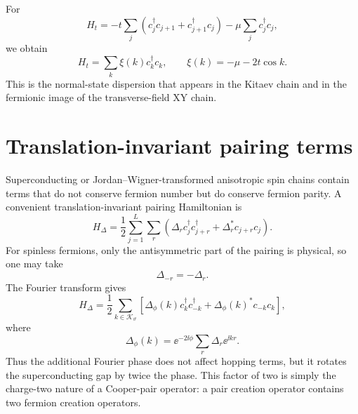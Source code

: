 \begin{example}
For
\begin{equation}
    H_t=-t\sum_j\left(c_j^\dagger c_{j+1}+c_{j+1}^\dagger c_j\right)
    -\mu\sum_j c_j^\dagger c_j,
\end{equation}
we obtain
\begin{equation}
    H_t=
    \sum_k\xi(k)c_k^\dagger c_k,
    \qquad
    \xi(k)=-\mu-2t\cos k.
\end{equation}
This is the normal-state dispersion that appears in the Kitaev chain and in the
fermionic image of the transverse-field XY chain.
\end{example}

\section{Translation-invariant pairing terms}

Superconducting or Jordan--Wigner-transformed anisotropic spin chains contain
terms that do not conserve fermion number but do conserve fermion parity.  A
convenient translation-invariant pairing Hamiltonian is
\begin{equation}
\label{eq:general-pairing-creation-form}
    H_\Delta
    =
    \frac{1}{2}\sum_{j=1}^{L}\sum_r
    \left(
    \Delta_r c_j^\dagger c_{j+r}^\dagger
    +
    \Delta_r^* c_{j+r}c_j
    \right).
\end{equation}
For spinless fermions, only the antisymmetric part of the pairing is physical,
so one may take
\begin{equation}
    \Delta_{-r}=-\Delta_r.
\end{equation}
The Fourier transform gives
\begin{equation}
\label{eq:momentum-space-pairing-gap-general}
    H_\Delta
    =
    \frac{1}{2}\sum_{k\in\mathcal{K}_\vartheta}
    \left[
    \Delta_\phi(k)c_k^\dagger c_{-k}^\dagger
    +
    \Delta_\phi(k)^*c_{-k}c_k
    \right],
\end{equation}
where
\begin{equation}
\label{eq:gap-function-with-fourier-phase}
    \Delta_\phi(k)
    =
    \ee^{-2\ii\phi}
    \sum_r\Delta_r\ee^{\ii k r}.
\end{equation}
Thus the additional Fourier phase does not affect hopping terms, but it rotates
the superconducting gap by twice the phase.  This factor of two is simply the
charge-two nature of a Cooper-pair operator: a pair creation operator contains two
fermion creation operators.

